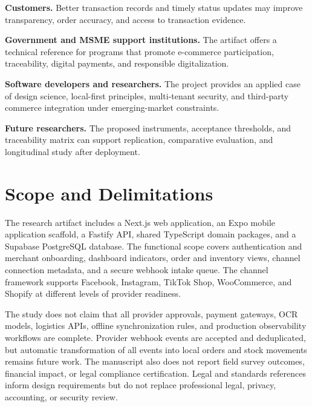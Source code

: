 \documentclass[12pt,oneside]{report}
\begin{document}
\textbf{Customers.} Better transaction records and timely status updates may
improve transparency, order accuracy, and access to transaction evidence.

\textbf{Government and MSME support institutions.} The artifact offers a
technical reference for programs that promote e-commerce participation,
traceability, digital payments, and responsible digitalization.

\textbf{Software developers and researchers.} The project provides an applied
case of design science, local-first principles, multi-tenant security, and
third-party commerce integration under emerging-market constraints.

\textbf{Future researchers.} The proposed instruments, acceptance thresholds,
and traceability matrix can support replication, comparative evaluation, and
longitudinal study after deployment.

\section{Scope and Delimitations}
The research artifact includes a Next.js web application, an Expo mobile
application scaffold, a Fastify API, shared TypeScript domain packages, and a
Supabase PostgreSQL database. The functional scope covers authentication and
merchant onboarding, dashboard indicators, order and inventory views, channel
connection metadata, and a secure webhook intake queue. The channel framework
supports Facebook, Instagram, TikTok Shop, WooCommerce, and Shopify at different
levels of provider readiness.

The study does not claim that all provider approvals, payment gateways, OCR
models, logistics APIs, offline synchronization rules, and production
observability workflows are complete. Provider webhook events are accepted and
deduplicated, but automatic transformation of all events into local orders and
stock movements remains future work. The manuscript also does not report field
survey outcomes, financial impact, or legal compliance certification. Legal and
standards references inform design requirements but do not replace professional
legal, privacy, accounting, or security review.
\end{document}

